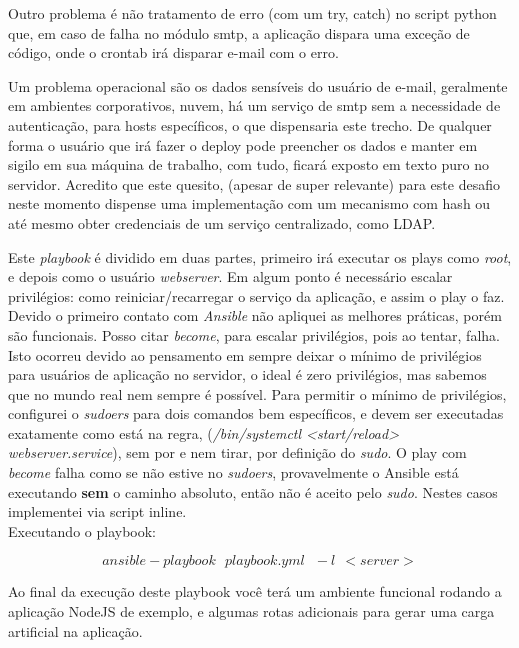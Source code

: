 Outro problema é não tratamento de erro (com um try, catch) no script
python que, em caso de falha no módulo smtp, a aplicação dispara uma
exceção de código, onde o crontab irá disparar e-mail com o erro.

Um problema operacional são os dados sensíveis do usuário de e-mail,
geralmente em ambientes corporativos, nuvem, há um serviço de smtp
sem a necessidade de autenticação, para hosts específicos, o que
dispensaria este trecho. De qualquer forma o usuário que irá fazer o
deploy pode preencher os dados e manter em sigilo em sua máquina de
trabalho, com tudo, ficará exposto em texto puro no servidor. Acredito
que este quesito, (apesar de super relevante) para este desafio neste
momento dispense uma implementação com um mecanismo com hash ou até
mesmo obter credenciais de um serviço centralizado, como LDAP.

Este \emph{playbook} é dividido em duas partes, primeiro irá executar
os plays como \emph{root}, e depois como o usuário \emph{webserver}.
Em algum ponto é necessário escalar privilégios: como
reiniciar/recarregar o serviço da aplicação, e assim o play
o faz. Devido o primeiro contato com \emph{Ansible} não apliquei as
melhores práticas, porém são funcionais. Posso citar \emph{become}, para
escalar privilégios, pois ao tentar, falha. Isto ocorreu devido ao
pensamento em sempre deixar o mínimo de privilégios para usuários de
aplicação no servidor, o ideal é zero privilégios, mas sabemos que no
mundo real nem sempre é possível. Para permitir o mínimo de
privilégios, configurei o \emph{sudoers} para dois comandos bem
específicos, e devem ser executadas exatamente como está na regra,
(\emph{/bin/systemctl <start/reload> webserver.service}), sem por e nem
tirar, por definição do \emph{sudo}. O play com \emph{become} falha
como se não estive no \emph{sudoers}, provavelmente o Ansible está
executando \textbf{sem} o caminho absoluto, então não é aceito pelo
\emph{sudo}. Nestes casos implementei via script inline.\\

Executando o playbook:

$$ansible-playbook\ \ \ playbook.yml\ \ \ -l\ \ <server>$$

Ao final da execução deste playbook você terá um ambiente funcional
rodando a aplicação NodeJS de exemplo, e algumas rotas adicionais para
gerar uma carga artificial na aplicação.\\

